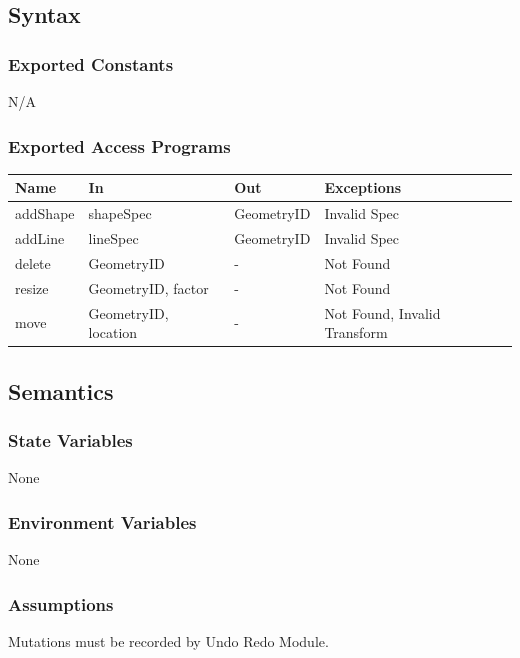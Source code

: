 \documentclass[12pt, titlepage]{article}
\begin{document}
\subsection{Syntax}

\subsubsection{Exported Constants}
N/A
\subsubsection{Exported Access Programs}

\begin{center}
\begin{tabular}{p{2cm} p{4cm} p{4cm} p{2cm}}
\hline
\textbf{Name} & \textbf{In} & \textbf{Out} & \textbf{Exceptions} \\
\hline
{addShape} & shapeSpec & GeometryID & Invalid Spec \\
\hline
{addLine} & lineSpec & GeometryID & Invalid Spec \\
\hline
{delete} & GeometryID & - & Not Found \\
\hline
{resize} & GeometryID, factor & - & Not Found \\
\hline
{move} & GeometryID, location & - & Not Found, Invalid Transform \\
\hline
\end{tabular}
\end{center}

\subsection{Semantics}

\subsubsection{State Variables}
None

\subsubsection{Environment Variables}
None

\subsubsection{Assumptions}
Mutations must be recorded by Undo Redo Module.
\end{document}
